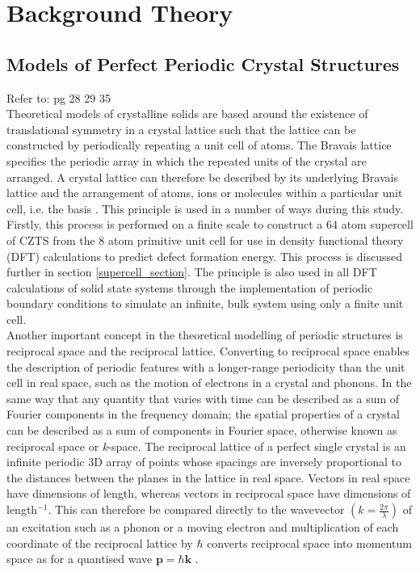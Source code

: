 
\chapter{Background Theory}

\label{ch:background}

\section{Models of Perfect Periodic Crystal Structures}\label{perfect_periodic}
Refer to: pg 28 29 35 \cite{thin_film_Boer}\\

Theoretical models of crystalline solids are based around the existence of translational symmetry in a crystal lattice such that the lattice can be constructed by periodically repeating a unit cell of atoms. The Bravais lattice specifies the periodic array in which the repeated units of the crystal are arranged. A crystal lattice can therefore be described by its underlying Bravais lattice and the arrangement of atoms, ions or molecules within a particular unit cell, i.e. the basis \cite{AshcroftMermin2}. This principle is used in a number of ways during this study. Firstly, this process is performed on a finite scale to construct a 64 atom supercell of CZTS from the 8 atom primitive unit cell for use in density functional theory (DFT) calculations to predict defect formation energy. This process is discussed further in section \ref{supercell_section}. The principle is also used in all DFT calculations of solid state systems through the implementation of periodic boundary conditions to simulate an infinite, bulk system using only a finite unit cell.\\
 
Another important concept in the theoretical modelling of periodic structures is reciprocal space and the reciprocal lattice. 
Converting to reciprocal space enables the description of periodic features with a longer-range periodicity than the unit cell in real space, such as the motion of electrons in a crystal and phonons.
In the same way that any quantity that varies with time can be described as a sum of Fourier components in the frequency domain; the spatial properties of a crystal can be described as a sum of components in Fourier space, otherwise known as reciprocal space or \textit{k}-space. The reciprocal lattice of a perfect single crystal is an infinite periodic 3D array of points whose spacings are inversely proportional to the distances between the planes in the lattice in real space. Vectors in real space have dimensions of length, whereas vectors in reciprocal space have dimensions of length$^{-1}$. This can therefore be compared directly to the wavevector $ \left(k  = \frac{2\pi}{\lambda} \right)$ of an excitation such as a phonon or a moving electron and multiplication of each coordinate of the reciprocal lattice by $\hbar$ converts reciprocal space into momentum space as for a quantised wave $\mathbf{p} = \hbar \mathbf{k}$ \cite{Blakemore1}. \\ 

